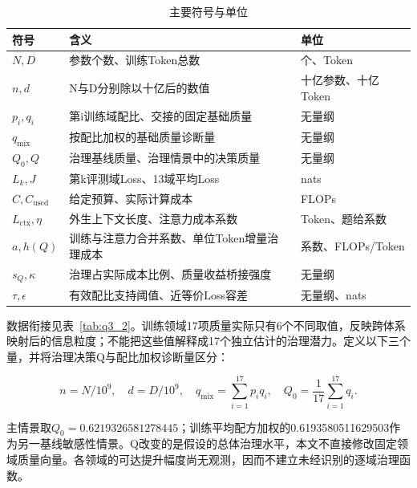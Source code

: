 \documentclass[UTF8,12pt,a4paper]{ctexart}
\begin{document}
\begin{table}[htbp]\centering\setlength{\tabcolsep}{3pt}\renewcommand{\arraystretch}{1.12}
\caption{主要符号与单位}\label{tab:q3_1}
\begin{tabularx}{\textwidth}{>{\raggedright\arraybackslash}p{2.975132cm}>{\raggedright\arraybackslash}p{8.925397cm}>{\raggedright\arraybackslash}X}\toprule
符号 & 含义 & 单位 \\
\midrule
$N, D$ & 参数个数、训练Token总数 & 个、Token \\
$n, d$ & N与D分别除以十亿后的数值 & 十亿参数、十亿Token \\
$p_i, q_i$ & 第i训练域配比、交接的固定基础质量 & 无量纲 \\
$q_{\mathrm{mix}}$ & 按配比加权的基础质量诊断量 & 无量纲 \\
$Q_0, Q$ & 治理基线质量、治理情景中的决策质量 & 无量纲 \\
$L_k, J$ & 第k评测域Loss、13域平均Loss & nats \\
$C, C_{\mathrm{used}}$ & 给定预算、实际计算成本 & FLOPs \\
$L_{\mathrm{ctx}}, \eta$ & 外生上下文长度、注意力成本系数 & Token、题给系数 \\
$a, h(Q)$ & 训练与注意力合并系数、单位Token增量治理成本 & 系数、FLOPs/Token \\
$s_Q, \kappa$ & 治理占实际成本比例、质量收益桥接强度 & 无量纲 \\
$\tau, \epsilon$ & 有效配比支持阈值、近等价Loss容差 & 无量纲、nats \\
\bottomrule\end{tabularx}
\end{table}

数据衔接见表~\ref{tab:q3_2}。训练领域17项质量实际只有6个不同取值，反映跨体系映射后的信息粒度；不能把这些值解释成17个独立估计的治理潜力。定义以下三个量，并将治理决策Q与配比加权诊断量区分：


\begin{equation}\label{eq:q3_1}
n=N/10^9,\quad d=D/10^9,\quad q_{\mathrm{mix}}=\sum_{i=1}^{17}p_iq_i,\quad Q_0=\frac{1}{17}\sum_{i=1}^{17}q_i.
\end{equation}

主情景取$Q_0=0.6219326581278445$；训练平均配方加权的0.6193580511629503作为另一基线敏感性情景。Q改变的是假设的总体治理水平，本文不直接修改固定领域质量向量。各领域的可达提升幅度尚无观测，因而不建立未经识别的逐域治理函数。
\end{document}
